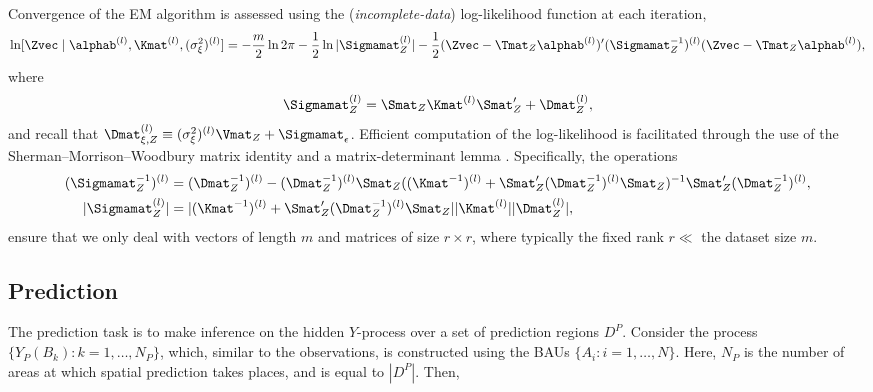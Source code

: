 Convergence of the EM algorithm is assessed using the (\emph{incomplete-data}) log-likelihood function at each iteration,
\begin{equation}
\ln [\Zvec \mid \alphab^{(l)}, \Kmat^{(l)}, (\sigma^2_\xi)^{(l)}] = -\frac{m}{2}\ln 2\pi -\frac{1}{2}\ln |\Sigmamat_Z^{(l)}| - \frac{1}{2}(\Zvec - \Tmat_Z\alphab^{(l)})'(\Sigmamat_Z^{-1})^{(l)}(\Zvec - \Tmat_Z\alphab^{(l)}),
\end{equation}
where
\begin{equation}
\Sigmamat_Z^{(l)} = \Smat_Z \Kmat^{(l)} \Smat_Z' + \Dmat_Z^{(l)},
\end{equation}
and recall that $\Dmat_{\xi,Z}^{(l)} \equiv (\sigma_\xi^2)^{(l)}\Vmat_Z + \Sigmamat_\epsilon$. Efficient computation of the log-likelihood is facilitated through the use of the Sherman--Morrison--Woodbury matrix identity and a matrix-determinant lemma \citep[e.g.,][]{Henderson_1981}. Specifically, the operations
\begin{align}
(\Sigmamat_Z^{-1})^{(l)} &= (\Dmat_Z^{-1})^{(l)} - (\Dmat_Z^{-1})^{(l)} \Smat_Z ((\Kmat^{-1})^{(l)} + \Smat'_Z (\Dmat_Z^{-1})^{(l)}\Smat_Z)^{-1}\Smat_Z'(\Dmat_Z^{-1})^{(l)},\\
| \Sigmamat_Z^{(l)}  | &= | (\Kmat^{-1})^{(l)} + \Smat_Z'(\Dmat_Z^{-1})^{(l)} \Smat_Z | |\Kmat^{(l)} | |\Dmat_Z^{(l)} |,\label{eq:determinant}
\end{align}
ensure that we only deal with vectors of length $m$ and matrices of size $r \times r$, where typically the fixed rank $r \ll$ the dataset size $m$.


\subsection{Prediction} \label{sec:prediction}

The prediction task is to make inference on the hidden $Y$-process over a set of prediction regions $D^P$. Consider the process $\{Y_P(B_k): k = 1,\dots,N_P\}$, which, similar to the observations, is constructed using the BAUs $\{A_i: i = 1,\dots,N\}$. Here, $N_P$ is the number of areas at which spatial prediction takes places, and is equal to $|D^P|$. Then,

